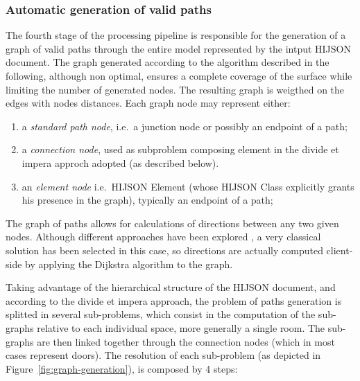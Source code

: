 \subsubsection{Automatic generation of valid paths}\label{algorithmics-automatic-generation-of-valid-paths}\label{sec:paths}

The fourth stage of the processing pipeline is responsible for the
generation of a graph of valid paths through the entire model
represented by the intput HIJSON document. The graph generated according
to the algorithm described in the following, although non optimal,
ensures a complete coverage of the surface while limiting the number of
generated nodes. The resulting graph is weigthed on the edges with nodes
distances. Each graph node may represent either:

\begin{enumerate}
\def\labelenumi{\alph{enumi}.}
\itemsep1pt\parskip0pt
\item
 a \emph{standard path node}, i.e.~a junction node or possibly an endpoint of a
 path;
\item
 a \emph{connection node}, used as subproblem composing element in the divide et
 impera approch adopted (as described below).
\item
an \emph{element node} i.e.~HIJSON Element (whose HIJSON Class explicitly grants
 his presence in the graph), typically an endpoint of a path;
\end{enumerate}

The graph of paths allows for calculations of directions between any two given
nodes. Although different approaches have been explored \cite{6999103}, 
a very classical solution has been selected in this case, so directions 
are actually computed client-side by applying the Dijkstra algorithm to the graph. 

Taking advantage of the hierarchical structure of the HIJSON document,
and according to the divide et impera approach, the problem of 
paths generation is splitted in several sub-problems, which consist in
the computation of the sub-graphs relative to each individual space, more generally a single room. The sub-graphs are then linked together through the
connection nodes (which in most cases represent doors). The resolution
of each sub-problem (as depicted in Figure~\ref{fig:graph-generation}), 
is composed by 4 steps:

